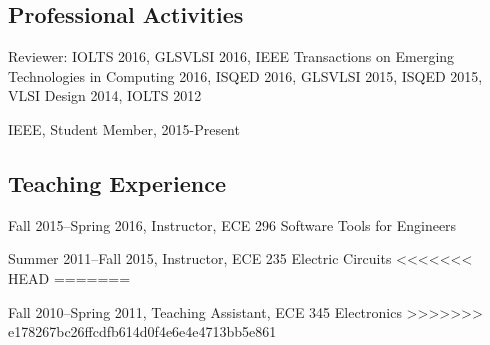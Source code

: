\documentclass[letterpaper]{article}
\renewenvironment{itemize}{
  \begin{list}{}{
    \setlength{\leftmargin}{1.5em}
  }
}{
  \end{list}
}
\begin{document}
\subsection*{Professional Activities}

\begin{itemize}
	\item Reviewer: IOLTS 2016, GLSVLSI 2016,  IEEE Transactions on Emerging Technologies in Computing 2016, ISQED 2016, GLSVLSI 2015, ISQED 2015, VLSI Design 2014, IOLTS 2012
	\item IEEE, Student Member, 2015-Present
\end{itemize}

\subsection*{Teaching Experience}

\begin{itemize}
	\item Fall 2015--Spring 2016, Instructor, ECE 296 Software Tools for Engineers
	\item Summer 2011--Fall 2015, Instructor, ECE 235 Electric Circuits
<<<<<<< HEAD
=======
	\item Fall 2010--Spring 2011, Teaching Assistant, ECE 345 Electronics
>>>>>>> e178267bc26ffcdfb614d0f4e6e4e4713bb5e861
\end{itemize}
\end{document}
